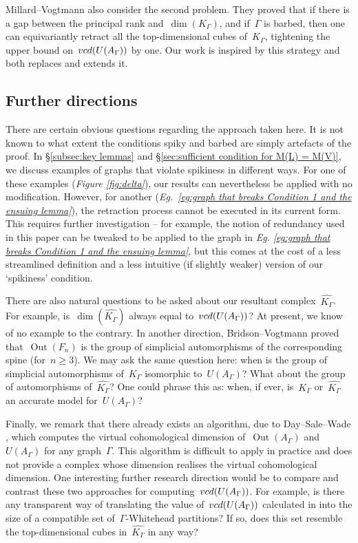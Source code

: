 \documentclass[11pt]{amsart}
\theoremstyle{definition}
\theoremstyle{definition}
\theoremstyle{definition}
\theoremstyle{definition}
\newcommand{\uag}{U(A_{\Gamma})} %
\newcommand{\oag}{\operatorname{Out}(A_{\Gamma})} %
\newcommand{\vcduag}{\textsc{vcd}(U(A_{\Gamma}))} %
\newcommand{\spine}{K_{\Gamma}} %
\newcommand{\res}{\widehat{K_\Gamma}} %
\begin{document}
Millard--Vogtmann also consider the second problem. They proved that if there is a gap between the principal rank and~$\dim(\spine)$, and if~$\Gamma$ is barbed, then one can equivariantly retract all the top-dimensional cubes of~$\spine$, tightening the upper bound on~$\vcduag$ by one. Our work is inspired by this strategy and both replaces and extends it.

\subsection{Further directions}\label{subsec:further work}

There are certain obvious questions regarding the approach taken here. It is not known to what extent the conditions spiky and barbed are simply artefacts of the proof. In \S\ref{subsec:key lemmas} and \S\ref{sec:sufficient condition for M(L) = M(V)}, we discuss examples of graphs that violate spikiness in different ways. For one of these examples (\textit{Figure \ref{fig:delta}}), our results can nevertheless be applied with no modification. However, for another (\textit{Eg.~\ref{eg:graph that breaks Condition 1 and the ensuing lemma}}), the retraction process cannot be executed in its current form. This requires further investigation -- for example, the notion of redundancy used in this paper can be tweaked to be applied to the graph in \emph{Eg. \ref{eg:graph that breaks Condition 1 and the ensuing lemma}}, but this comes at the cost of a less streamlined definition and a less intuitive (if slightly weaker) version of our `spikiness' condition.

There are also natural questions to be asked about our resultant complex~$\res$. For example, is~$\dim(\res)$ always equal to~$\vcduag$? At present, we know of no example to the contrary. In another direction, Bridson--Vogtmann \cite{BridsonVogtmannSymsOuterSpace01} proved that~$\operatorname{Out}(F_n)$ is the group of simplicial automorphisms of the corresponding spine (for~$n \geq 3$). We may ask the same question here: when is the group of simplicial automorphisms of~$\spine$ isomorphic to~$\uag$? What about the group of automorphisms of~$\res$? One could phrase this as: when, if ever, is~$\spine$ or~$\res$ an accurate model for~$\uag$?

Finally, we remark that there already exists an algorithm, due to Day--Sale--Wade \cite{DaySaleWadeVCDAlgorithm21}, which computes the virtual cohomological dimension of~$\oag$ and~$\uag$ for any graph~$\Gamma$. This algorithm is difficult to apply in practice and does not provide a complex whose dimension realises the virtual cohomological dimension. One interesting further research direction would be to compare and contrast these two approaches for computing~$\vcduag$. For example, is there any transparent way of translating the value of~$\vcduag$ calculated in \cite{DaySaleWadeVCDAlgorithm21} into the size of a compatible set of~$\Gamma$-Whitehead partitions? If so, does this set resemble the top-dimensional cubes in~$\res$ in any way?
\end{document}
